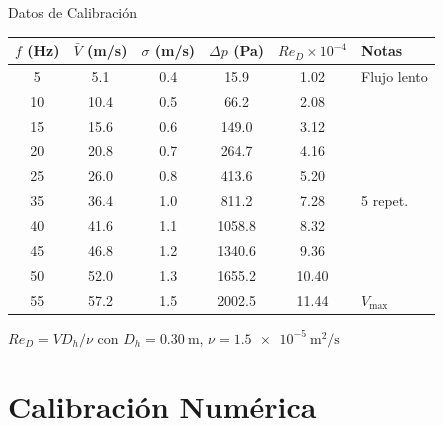 \documentclass[aspectratio=169,12pt]{beamer}
\begin{document}
\begin{frame}{Datos de Calibración}
	\centering\small
	\begin{tabular}{SSSSSl}
		\toprule
		{$f$ (Hz)} & {$\bar{V}$ (m/s)} & {$\sigma$ (m/s)}
		           & {$\Delta p$ (Pa)} & {$Re_D \times 10^{-4}$}
		           & \textbf{Notas}                                                                  \\
		          & 5.1               & 0.4                     & 15.9   & 1.02  & Flujo lento      \\
		10         & 10.4              & 0.5                     & 66.2   & 2.08  &                  \\
		15         & 15.6              & 0.6                     & 149.0  & 3.12  &                  \\
		20         & 20.8              & 0.7                     & 264.7  & 4.16  &                  \\
		25         & 26.0              & 0.8                     & 413.6  & 5.20  &                  \\
		35         & 36.4              & 1.0                     & 811.2  & 7.28  & 5 repet.         \\
		40         & 41.6              & 1.1                     & 1058.8 & 8.32  &                  \\
		45         & 46.8              & 1.2                     & 1340.6 & 9.36  &                  \\
		50         & 52.0              & 1.3                     & 1655.2 & 10.40 &                  \\
		55         & 57.2              & 1.5                     & 2002.5 & 11.44 & $V_\mathrm{max}$ \\
		\bottomrule
	\end{tabular}

	\vspace{0.3em}
	{\scriptsize $Re_D = V D_h / \nu$ con $D_h = \SI{0.30}{\m}$,
		$\nu = \SI{1.5e-5}{\m\squared\per\s}$}
\end{frame}

\section{Calibración Numérica}
\end{document}
